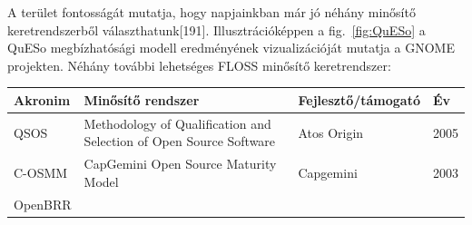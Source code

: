 \documentclass[12pt,magyar,a4paper,oneside]{scrreprt}
\begin{document}
A terület fontosságát mutatja, hogy napjainkban már jó néhány minősítő
keretrendszerből választhatunk{[}191{]}. Illusztrációképpen a
fig.~\ref{fig:QuESo} a QuESo megbízhatósági modell eredményének
vizualizációját mutatja a GNOME projekten. Néhány további lehetséges
FLOSS minősítő keretrendszer:

\begin{longtable}[]{@{}llll@{}}
\toprule
\begin{minipage}[b]{0.14\columnwidth}\raggedright
Akronim\strut
\end{minipage} & \begin{minipage}[b]{0.49\columnwidth}\raggedright
Minősítő rendszer\strut
\end{minipage} & \begin{minipage}[b]{0.21\columnwidth}\raggedright
Fejlesztő/támogató\strut
\end{minipage} & \begin{minipage}[b]{0.04\columnwidth}\raggedright
Év\strut
\end{minipage}\tabularnewline
\midrule
\endhead
\begin{minipage}[t]{0.14\columnwidth}\raggedright
QSOS\strut
\end{minipage} & \begin{minipage}[t]{0.49\columnwidth}\raggedright
Methodology of Qualification and Selection of Open Source Software\strut
\end{minipage} & \begin{minipage}[t]{0.21\columnwidth}\raggedright
Atos Origin\strut
\end{minipage} & \begin{minipage}[t]{0.04\columnwidth}\raggedright
2005\strut
\end{minipage}\tabularnewline
\begin{minipage}[t]{0.14\columnwidth}\raggedright
C-OSMM\strut
\end{minipage} & \begin{minipage}[t]{0.49\columnwidth}\raggedright
CapGemini Open Source Maturity Model\strut
\end{minipage} & \begin{minipage}[t]{0.21\columnwidth}\raggedright
Capgemini\strut
\end{minipage} & \begin{minipage}[t]{0.04\columnwidth}\raggedright
2003\strut
\end{minipage}\tabularnewline
\begin{minipage}[t]{0.14\columnwidth}\raggedright
OpenBRR\strut

\end{minipage}
\end{longtable}
\end{document}
